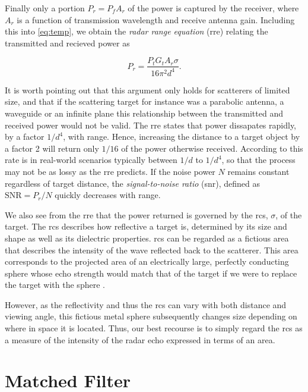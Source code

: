 Finally only a portion $P_r = P_fA_r$ of the power is captured by the receiver, where $A_r$ is a function of transmission wavelength and receive antenna gain. Including this into \eqref{eq:temp}, we obtain the \emph{radar range equation} (\gls{rre}) relating the transmitted and recieved power as

\begin{equation}
	P_r
	= \frac{P_t G_t A_r \sigma}{16\pi^2 d^4}.
\end{equation}

It is worth pointing out that this argument only holds for scatterers of limited size, and that if the scattering target for instance was a parabolic antenna, a waveguide or an infinite plane this relationship between the transmitted and received power would not be valid. The \gls{rre} states that power dissapates rapidly, by a factor $1/d^4$, with range. Hence, increasing the distance to a target object by a factor 2 will return only $1/16$ of the power otherwise received. According to \citep{richards_2014} this rate is in real-world scenarios typically between $1/d$ to $1/d^4$, so that the process may not be as lossy as the \gls{rre} predicts. If the noise power $N$ remains constant regardless of target distance, the \emph{signal-to-noise ratio} (\gls{snr}), defined as $\text{SNR} = P_r/N$ quickly decreases with range. 

We also see from the \gls{rre} that the power returned is governed by the \gls{rcs}, $\sigma$, of the target. The \gls{rcs} describes how reflective a target is, determined by its size and shape as well as its dielectric properties. \gls{rcs} can be regarded as a fictious area that describes the intensity of the wave reflected back to the scatterer. This area corresponds to the projected area of an electrically large, perfectly conducting sphere whose echo strength would match that of the target if we were to replace the target with the sphere \citep{knott_1993}. 

However, as the reflectivity and thus the \gls{rcs} can vary with both distance and viewing angle, this fictious metal sphere subsequently changes size depending on where in space it is located. Thus, our best recourse is to simply regard the \gls{rcs} as a measure of the intensity of the radar echo expressed in terms of an area. 

\section{Matched Filter}\label{sec:mf}

